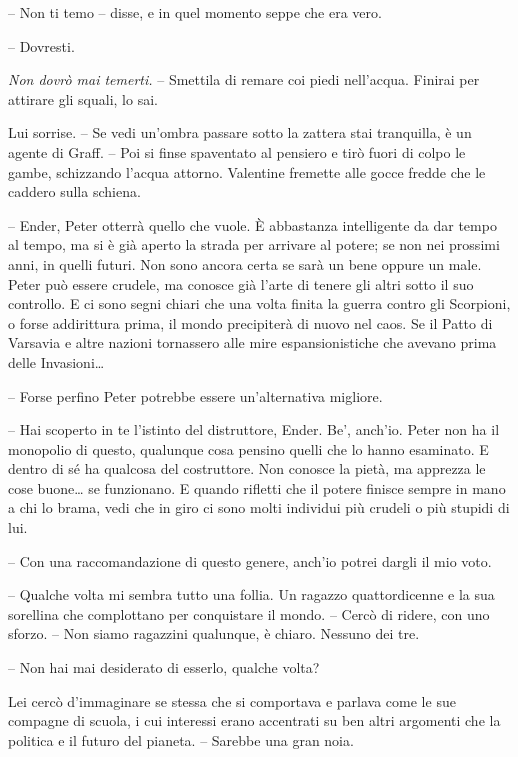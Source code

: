 {-- Non ti temo -- disse, e in quel momento seppe che era vero.}

{-- Dovresti.}

\emph{{Non dovrò mai temerti. }}{-- Smettila di remare coi piedi
	nell'acqua. Finirai per attirare gli squali, lo sai.}

{Lui sorrise. -- Se vedi un'ombra passare sotto la zattera stai
	tranquilla, è un agente di Graff. -- Poi si finse spaventato al pensiero
	e tirò fuori di colpo le gambe, schizzando l'acqua attorno. Valentine
	fremette alle gocce fredde che le caddero sulla schiena.}

{-- Ender, Peter otterrà quello che vuole. È abbastanza intelligente da
	dar tempo al tempo, ma si è già aperto la strada per arrivare al potere;
	se non nei prossimi anni, in quelli futuri. Non sono ancora certa se
	sarà un bene oppure un male. Peter può essere crudele, ma conosce già
	l'arte di tenere gli altri sotto il suo controllo. E ci sono segni
	chiari che una volta finita la guerra contro gli Scorpioni, o forse
	addirittura prima, il mondo precipiterà di nuovo nel caos. Se il Patto
	di Varsavia e altre nazioni tornassero alle mire espansionistiche che
	avevano prima delle Invasioni\ldots{}}

{-- Forse perfino Peter potrebbe essere un'alternativa migliore.}

{-- Hai scoperto in te l'istinto del distruttore, Ender. Be', anch'io.
	Peter non ha il monopolio di questo, qualunque cosa pensino quelli che
	lo hanno esaminato. E dentro di sé ha qualcosa del costruttore. Non
	conosce la pietà, ma apprezza le cose buone\ldots{} se funzionano. E
	quando rifletti che il potere finisce sempre in mano a chi lo brama,
	vedi che in giro ci sono molti individui più crudeli o più stupidi di
	lui.}

{-- Con una raccomandazione di questo genere, anch'io potrei dargli il
	mio voto.}

{-- Qualche volta mi sembra tutto una follia. Un ragazzo quattordicenne
	e la sua sorellina che complottano per conquistare il mondo. -- Cercò di
	ridere, con uno sforzo. -- Non siamo ragazzini qualunque, è chiaro.
	Nessuno dei tre.}

{-- Non hai mai desiderato di esserlo, qualche volta?}

{Lei cercò d'immaginare se stessa che si comportava e parlava come le
	sue compagne di scuola, i cui interessi erano accentrati su ben altri
	argomenti che la politica e il futuro del pianeta. -- Sarebbe una gran
	noia.}

